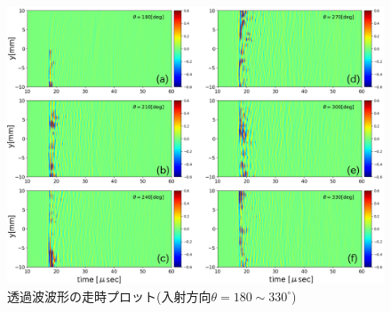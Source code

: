 \begin{figure}[h]
	\begin{center}
	\includegraphics[width=1.0\linewidth]{Figs/fig5_3.eps} 
	\end{center}
	\caption{
		透過波波形の走時プロット(入射方向$\theta=180\sim 330^{\circ}$)
	} 
	\label{fig:fig5_3}
\end{figure}
